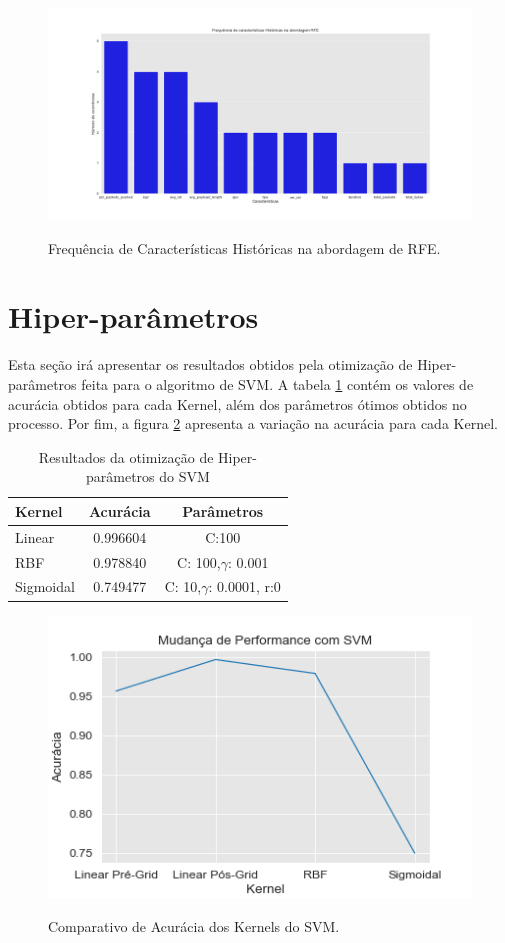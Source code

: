\begin{figure}[h]
\caption{Frequência de Características Históricas na abordagem de RFE.}
\centering
\includegraphics[scale=0.30]{figs/CaracteristicasSVM.png}
\label{r.graf6}
\end{figure}

\section{Hiper-parâmetros}

Esta seção irá apresentar os resultados obtidos pela otimização de Hiper-parâmetros feita para o algoritmo de SVM. A tabela \ref{r.t3} contém os valores de acurácia obtidos para cada Kernel, além dos parâmetros ótimos obtidos no processo. Por fim, a figura \ref{r.grafgrid} apresenta a variação na acurácia para cada Kernel.

\begin{table}[h!]
  \begin{center}
    \caption{Resultados da otimização de Hiper-parâmetros do SVM}
    \label{r.t3}
    \begin{tabular}{l|c|c} %
      \textbf{Kernel} & \textbf{Acurácia} & \textbf{Parâmetros}\\
      \hline
      Linear & 0.996604 & C:100\\
      RBF & 0.978840 & C: 100,$\gamma$: 0.001\\
      Sigmoidal & 0.749477 & C: 10,$\gamma$: 0.0001, r:0\\
    \end{tabular}
  \end{center}
\end{table}

\begin{figure}[h]
\caption{Comparativo de Acurácia dos Kernels do SVM.}
\centering
\includegraphics[scale=0.7]{figs/Hiperparametros.png}
\label{r.grafgrid}
\end{figure}